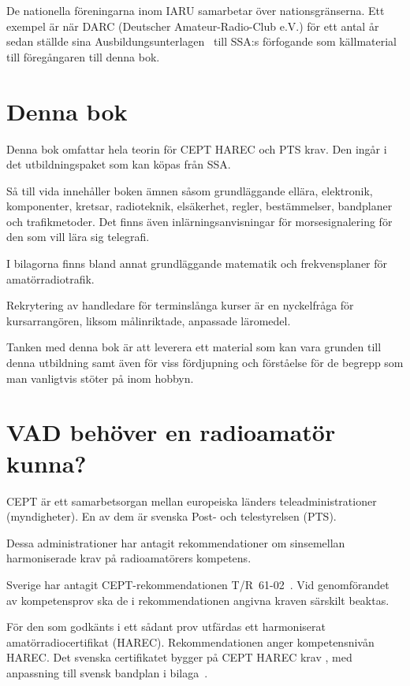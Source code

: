 De nationella föreningarna inom IARU samarbetar över nationsgränserna.
Ett exempel är när DARC (Deutscher Amateur-Radio-Club e.V.) för ett antal år
sedan ställde sina Ausbildungsunterlagen~\cite{DARCaus} till SSA:s förfogande
som källmaterial till föregångaren till denna bok.

\section*{Denna bok}

Denna bok omfattar hela teorin för CEPT HAREC och PTS krav.
Den ingår i det utbildningspaket som kan köpas från SSA.

Så till vida innehåller boken ämnen såsom grundläggande ellära, elektronik,
komponenter, kretsar, radioteknik, elsäkerhet, regler, bestämmelser, bandplaner
och trafikmetoder.
Det finns även inlärningsanvisningar för morsesignalering för den som vill lära
sig telegrafi.

I bilagorna finns bland annat grundläggande matematik och frekvensplaner för
amatörradiotrafik.

Rekrytering av handledare för terminslånga kurser är en nyckelfråga för
kursarrangören, liksom målinriktade, anpassade läromedel.

Tanken med denna bok är att leverera ett material som kan vara grunden till
denna utbildning samt även för viss fördjupning och förståelse för de begrepp
som man vanligtvis stöter på inom hobbyn.

\section*{VAD behöver en radioamatör kunna?}
\balance

CEPT är ett samarbetsorgan mellan europeiska länders teleadministrationer
(myndigheter).
En av dem är svenska Post- och telestyrelsen (PTS).

Dessa administrationer har antagit rekommendationer om sinsemellan
harmoniserade krav på radioamatörers kompetens.

Sverige har antagit CEPT-rekommendationen T/R~61-02~\cite{TR6102}.
Vid genomförandet av kompetensprov ska de i rekommendationen angivna kraven
särskilt beaktas.

För den som godkänts i ett sådant prov utfärdas ett harmoniserat
amatörradiocertifikat (HAREC).
Rekommendationen anger kompetensnivån HAREC.
%
Det svenska certifikatet bygger på CEPT HAREC krav \cite{TR6102},
med anpassning till svensk bandplan i bilaga~.

